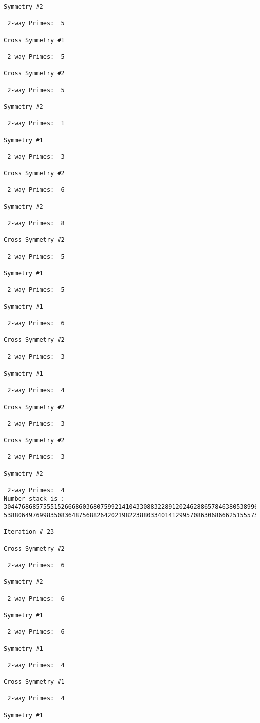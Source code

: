 {{{{\begin{verbatim}
Symmetry #2

 2-way Primes: 	5

Cross Symmetry #1

 2-way Primes: 	5

Cross Symmetry #2

 2-way Primes: 	5

Symmetry #2

 2-way Primes: 	1

Symmetry #1

 2-way Primes: 	3

Cross Symmetry #2

 2-way Primes: 	6

Symmetry #2

 2-way Primes: 	8

Cross Symmetry #2

 2-way Primes: 	5

Symmetry #1

 2-way Primes: 	5

Symmetry #1

 2-way Primes: 	6

Cross Symmetry #2

 2-way Primes: 	3

Symmetry #1

 2-way Primes: 	4

Cross Symmetry #2

 2-way Primes: 	3

Cross Symmetry #2

 2-way Primes: 	3

Symmetry #2

 2-way Primes: 	4
Number stack is :
30447686857555152666860368075992141043308832289120246288657846380538996794608835958544046240163340857
53880649769983508364875688264202198223880334014129957086306866625155575868674403758043361042640445859

Iteration #	23

Cross Symmetry #2

 2-way Primes: 	6

Symmetry #2

 2-way Primes: 	6

Symmetry #1

 2-way Primes: 	6

Symmetry #1

 2-way Primes: 	4

Cross Symmetry #1

 2-way Primes: 	4

Symmetry #1


\end{verbatim}}}}}
